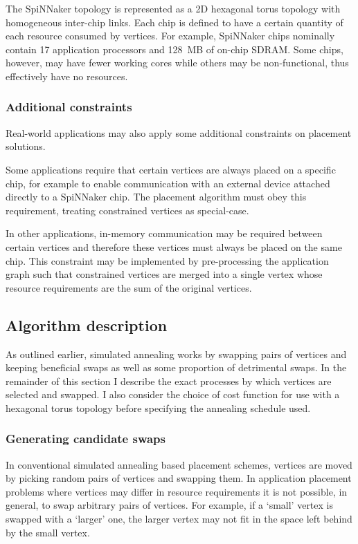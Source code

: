 			The SpiNNaker topology is represented as a 2D hexagonal torus topology
			with homogeneous inter-chip links. Each chip is defined to have a certain
			quantity of each resource consumed by vertices. For example, SpiNNaker
			chips nominally contain 17 application processors and 128~MB of on-chip
			SDRAM. Some chips, however, may have fewer working cores while others may
			be non-functional, thus effectively have no resources.
			
			\subsubsection{Additional constraints}
				
				Real-world applications may also apply some additional constraints on
				placement solutions.
				
				Some applications require that certain vertices are always placed on a
				specific chip, for example to enable communication with an external
				device attached directly to a SpiNNaker chip. The placement algorithm
				must obey this requirement, treating constrained vertices as
				special-case.
				
				In other applications, in-memory communication may be required between
				certain vertices and therefore these vertices must always be placed on
				the same chip. This constraint may be implemented by pre-processing the
				application graph such that constrained vertices are merged into a
				single vertex whose resource requirements are the sum of the original
				vertices.
		
		\subsection{Algorithm description}
			
			As outlined earlier, simulated annealing works by swapping pairs of
			vertices and keeping beneficial swaps as well as some proportion of
			detrimental swaps. In the remainder of this section I describe the exact
			processes by which vertices are selected and swapped. I also consider the
			choice of cost function for use with a hexagonal torus topology before
			specifying the annealing schedule used.
		
			\subsubsection{Generating candidate swaps}
				
				In conventional simulated annealing based placement schemes, vertices
				are moved by picking random pairs of vertices and swapping them. In
				application placement problems where vertices may differ in resource
				requirements it is not possible, in general, to swap arbitrary pairs of
				vertices. For example, if a `small' vertex is swapped with a `larger'
				one, the larger vertex may not fit in the space left behind by the
				small vertex.
				
